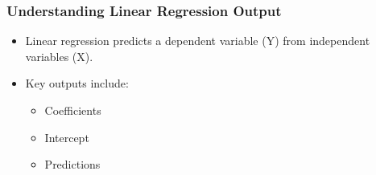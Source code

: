 \documentclass[aspectratio=169]{beamer}
\begin{document}
\begin{frame}[fragile]
    \frametitle{Understanding Linear Regression Output}
    \begin{itemize}
        \item Linear regression predicts a dependent variable (Y) from independent variables (X).
        \item Key outputs include:
        \begin{itemize}
            \item Coefficients
            \item Intercept
            \item Predictions
        \end{itemize}
    \end{itemize}
\end{frame}
\end{document}
